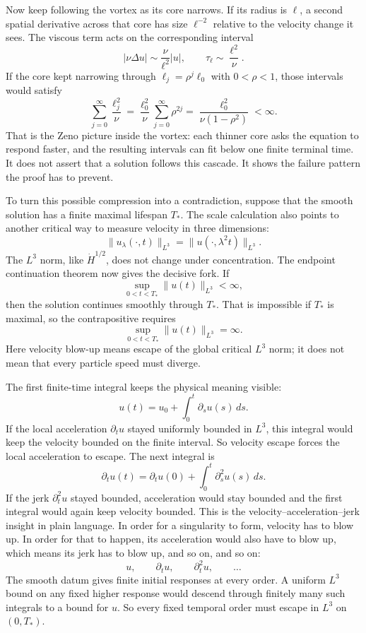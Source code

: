 Now keep following the vortex as its core narrows.  If its radius is
\(\ell\), a second spatial derivative across that core has size
\(\ell^{-2}\) relative to the velocity change it sees.  The viscous term acts
on the corresponding interval
\[
|\nu\Delta u|
\sim\frac{\nu}{\ell^2}|u|,
\qquad
\tau_\ell\sim\frac{\ell^2}{\nu}.
\]
If the core kept narrowing through
\(\ell_j=\rho^j\ell_0\) with \(0<\rho<1\), those intervals would satisfy
\[
\sum_{j=0}^{\infty}\frac{\ell_j^2}{\nu}
=\frac{\ell_0^2}{\nu}\sum_{j=0}^{\infty}\rho^{2j}
=\frac{\ell_0^2}{\nu(1-\rho^2)}<\infty.
\]
That is the Zeno picture inside the vortex: each thinner core asks the equation
to respond faster, and the resulting intervals can fit below one finite
terminal time.  It does not assert that a solution follows this cascade.  It
shows the failure pattern the proof has to prevent.

To turn this possible compression into a contradiction, suppose that the smooth
solution has a finite maximal lifespan \(T_*\).  The scale calculation also
points to another critical way to measure velocity in three dimensions:
\[
\|u_\lambda(\cdot,t)\|_{L^3}
=\|u(\cdot,\lambda^2t)\|_{L^3}.
\]
The \(L^3\) norm, like \(\dot H^{1/2}\), does not change under concentration.
The endpoint continuation theorem now gives the decisive fork.  If
\[
\sup_{0<t<T_*}\|u(t)\|_{L^3}<\infty,
\]
then the solution continues smoothly through \(T_*\).  That is impossible if
\(T_*\) is maximal, so the contrapositive requires
\[
\sup_{0<t<T_*}\|u(t)\|_{L^3}=\infty.
\]
Here velocity blow-up means escape of the global critical \(L^3\) norm; it
does not mean that every particle speed must diverge.

The first finite-time integral keeps the physical meaning visible:
\[
u(t)=u_0+\int_0^t\partial_su(s)\,ds.
\]
If the local acceleration \(\partial_tu\) stayed uniformly bounded in
\(L^3\), this integral would keep the velocity bounded on the finite interval.
So velocity escape forces the local acceleration to escape.  The next integral
is
\[
\partial_tu(t)
=\partial_tu(0)+\int_0^t\partial_s^2u(s)\,ds.
\]
If the jerk \(\partial_t^2u\) stayed bounded, acceleration would stay bounded
and the first integral would again keep velocity bounded.  This is the
velocity--acceleration--jerk insight in plain language.  In order for a
singularity to form, velocity has to blow up.  In order for
that to happen, its acceleration would also have to blow up, which means its
jerk has to blow up, and so on, and so on:
\[
u,\qquad \partial_tu,\qquad \partial_t^2u,\qquad\ldots
\]
The smooth datum gives finite initial responses at every order.  A uniform
\(L^3\) bound on any fixed higher response would descend through finitely
many such integrals to a bound for \(u\).  So every fixed temporal order must
escape in \(L^3\) on \((0,T_*)\).


